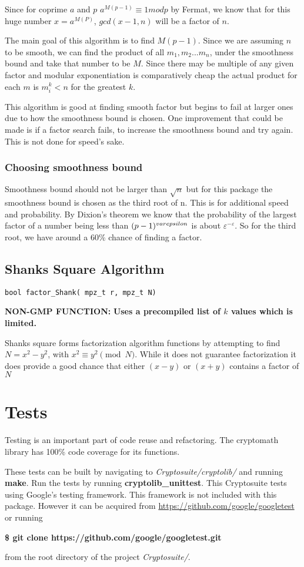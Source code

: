Since for coprime $a$ and $p$ $a^{M(p-1)} \equiv 1 mod p$ by Fermat, we know that for this huge number $x = a^{M(P)}$, $gcd(x-1, n)$ will be a factor of $n$.

The main goal of this algorithm is to find $M(p-1)$.
Since we are assuming $n$ to be smooth, we can find the product of all $m_1,m_2...m_n$, under the smoothness bound and take that number to be $M$.
Since there may be multiple of any given factor and modular exponentiation is comparatively cheap the actual product for each $m$ is $m_i^k < n$ for the greatest $k$.

This algorithm is good at finding smooth factor but begins to fail at larger ones due to how the smoothness bound is chosen.
One improvement that could be made is if a factor search fails, to increase the smoothness bound and try again.
This is not done for speed's sake.

\subsubsection{Choosing smoothness bound}
Smoothness bound should not be larger than $\sqrt{n}$ but for this package the smoothness bound is chosen as the third root of n.
This is for additional speed and probability.
By Dixion's theorem we know that the probability of the largest factor of a number being less than $(p-1)^{\\varepsilon}$ is about $\varepsilon^{-\varepsilon}$.
So for the third root, we have around a 60\% chance of finding a factor.

\subsection{Shanks Square Algorithm}
\begin{verbatim}
bool factor_Shank( mpz_t r, mpz_t N)
\end{verbatim}
\textbf{ NON-GMP FUNCTION:}
\textbf{Uses a precompiled list of $k$ values which is limited.} 

Shanks square forms factorization algorithm functions by attempting to find $N = x^2 - y^2$, with $x^2 \equiv y^2 \pmod N$.
While it does not guarantee factorization it does provide a good chance that either $(x-y)$ or $(x+y)$ contains a factor of $N$


\section{Tests}

Testing is an important part of code reuse and refactoring.
The cryptomath library has 100\% code coverage for its functions.

These tests can be built by navigating to \textit{Cryptosuite/cryptolib/} and running \textbf{make}.
Run the tests by running \textbf{cryptolib\_unittest}.
This Cryptosuite tests using Google's testing framework.
This framework is not included with this package.
However it can be acquired from \url{https://github.com/google/googletest} or running 
\begin{center}
\textbf{ \$ git clone https://github.com/google/googletest.git} 
\end{center}

from the root directory of the project \textit{Cryptosuite/}.
